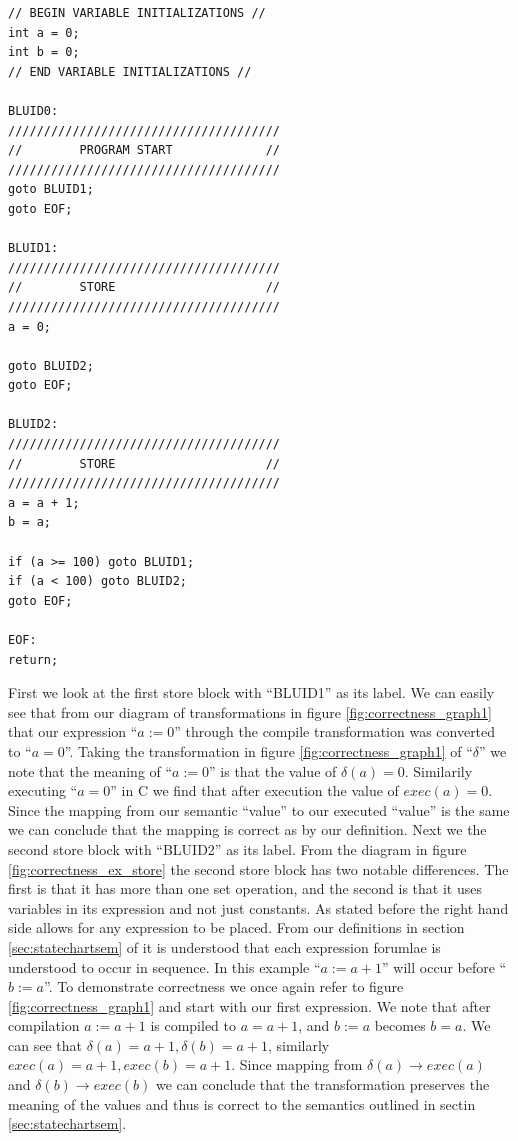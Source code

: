 \begin{minipage}{\textwidth}
\begin{lstlisting}[frame=single]
// BEGIN VARIABLE INITIALIZATIONS //
int a = 0;
int b = 0;
// END VARIABLE INITIALIZATIONS //

BLUID0:
//////////////////////////////////////
//        PROGRAM START             //
//////////////////////////////////////
goto BLUID1;
goto EOF;

BLUID1:
//////////////////////////////////////
//        STORE                     //
//////////////////////////////////////
a = 0;

goto BLUID2;
goto EOF;

BLUID2:
//////////////////////////////////////
//        STORE                     //
//////////////////////////////////////
a = a + 1;
b = a;

if (a >= 100) goto BLUID1;
if (a < 100) goto BLUID2;
goto EOF;

EOF:
return;
\end{lstlisting}
\end{minipage}

First we look at the first store block with ``BLUID1'' as its label. We can easily see that from our diagram of transformations in figure \ref{fig:correctness_graph1} that our expression ``$a := 0$'' through the compile transformation was converted to ``$a = 0$''. Taking the transformation in figure \ref{fig:correctness_graph1} of ``$\delta$'' we note that the meaning of ``$a := 0$'' is that the value of $\delta(a) = 0$. Similarily executing ``$a = 0$'' in C we find that after execution the value of $exec(a) = 0$. Since the mapping from our semantic ``value'' to our executed ``value'' is the same we can conclude that the mapping is correct as by our definition. Next we the second store block with ``BLUID2'' as its label. From the diagram in figure \ref{fig:correctness_ex_store} the second store block has two notable differences. The first is that it has more than one set operation, and the second is that it uses variables in its expression and not just constants. As stated before the right hand side allows for any expression to be placed. From our definitions in section \ref{sec:statechartsem} of \plcchart it is understood that each expression forumlae is understood to occur in sequence. In this example ``$a := a + 1$'' will occur before ``$b := a$''. To demonstrate correctness we once again refer to figure \ref{fig:correctness_graph1} and start with our first expression. We note that after compilation $a := a + 1$ is compiled to $a = a + 1$, and $b := a$ becomes $b = a$. We can see that $\delta(a) = a + 1, \delta(b) = a + 1$, similarly $exec(a) = a + 1, exec(b) = a + 1$. Since mapping from $\delta(a) \rightarrow exec(a)$ and $\delta(b) \rightarrow exec(b)$ we can conclude that the transformation preserves the meaning of the values and thus is correct to the semantics outlined in sectin \ref{sec:statechartsem}.

